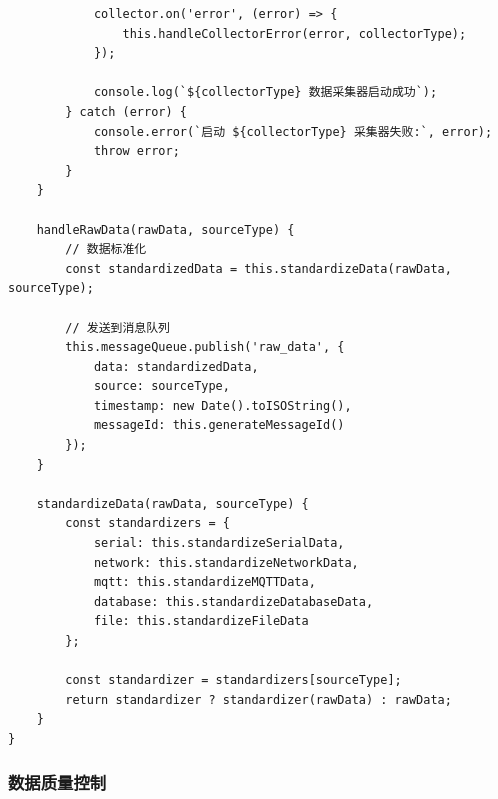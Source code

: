 \begin{lstlisting}
            collector.on('error', (error) => {
                this.handleCollectorError(error, collectorType);
            });
            
            console.log(`${collectorType} 数据采集器启动成功`);
        } catch (error) {
            console.error(`启动 ${collectorType} 采集器失败:`, error);
            throw error;
        }
    }
    
    handleRawData(rawData, sourceType) {
        // 数据标准化
        const standardizedData = this.standardizeData(rawData, sourceType);
        
        // 发送到消息队列
        this.messageQueue.publish('raw_data', {
            data: standardizedData,
            source: sourceType,
            timestamp: new Date().toISOString(),
            messageId: this.generateMessageId()
        });
    }
    
    standardizeData(rawData, sourceType) {
        const standardizers = {
            serial: this.standardizeSerialData,
            network: this.standardizeNetworkData,
            mqtt: this.standardizeMQTTData,
            database: this.standardizeDatabaseData,
            file: this.standardizeFileData
        };
        
        const standardizer = standardizers[sourceType];
        return standardizer ? standardizer(rawData) : rawData;
    }
}
\end{lstlisting}

\subsubsection{数据质量控制}\label{ux6570ux636eux8d28ux91cfux63a7ux5236}

